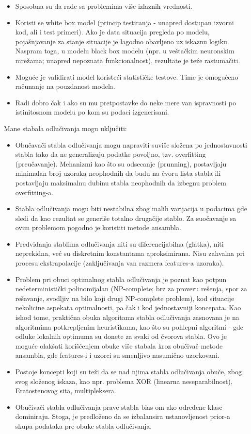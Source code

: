 \documentclass[fontsize=12bp, paper=a4]{scrarticle}
\begin{document}
\begin{itemize}
    \item Sposobna su da rade sa problemima više izlaznih vrednosti.
    \item Koristi se white box model (princip testiranja - unapred dostupan izvorni kod, ali i test primeri)\cite{wbox}. Ako je data situacija pregleda po modelu, pojašnjavanje za stanje situacije je lagodno obavljeno uz iskaznu logiku. Naspram toga, u modelu black box modelu (npr. u veštačkim neuronskim mrežama; unapred nepoznata funkcionalnost), rezultate je teže rastumačiti.
    \item Moguće je validirati model koristeći statističke testove. Time je omogućeno računanje na pouzdanost modela.
    \item Radi dobro čak i ako su mu pretpostavke do neke mere van ispravnosti po istinitosnom modelu po kom su podaci izgenerisani.
\end{itemize}

Mane stabala odlučivanja mogu uključiti:
\begin{itemize}
    \item Obučavači stabla odlučivanja mogu napraviti suviše složena po jednostavnosti stabla tako da ne generalizuju podatke povoljno, tzv. overfitting (preučavanje). Mehanizmi kao što su odsecanje (prunning), postavljaju minimalan broj uzoraka neophodnih da budu na čvoru lista stabla ili postavljaju maksimalnu dubinu stabla neophodnih da izbegnu problem overfitting-a. 
    \item Stabla odlučivanja mogu biti nestabilna zbog malih varijacija u podacima gde sledi da kao rezultat se generiše totalno drugačije stablo. Za suočavanje sa ovim problemom pogodno je koristiti metode ansambla.
    \item Predviđanja stablima odlučivanja niti su diferencijabilna (glatka), niti neprekidna, već su diskretnim konstantama aproksimirana. Nisu zahvalna pri procesu ekstrapolacije (zaključivanja van razmera features-a uzoraka)\cite{extrapolation}.
    \item Problem pri obuci optimalnog stabla odlučivanja je poznat kao potpun nedeterministički polinomijalan (NP-complete; brz za proveru rešenja, spor za rešavanje, svodljiv na bilo koji drugi NP-complete problem)\cite{np}, kod situacije nekolicine aspekata optimalnosti, pa čak i kod jednostavniji koncepata. Kao ishod tome, praktična obuka algoritama stabla odlučivanja zasnovana je na algoritmima potkrepljenim heuristikama, kao što su pohlepni algoritmi - gde odluke lokalnih optimuma su donete za svaki od čvorova stabla. Ovo je moguće olakšati korišćenjem obuke više stabala kroz obučivač metode ansambla, gde features-i i uzorci su smenljivo nasumično uzorkovani.
    \item Postoje koncepti koji su teži da se nad njima stabla odlučivanja obuče, zbog svog složenog iskaza, kao npr. problema XOR (linearna neseparabilnost)\cite{xor}, Eratostenovog sita\cite{sieve}, multipleksera.
    \item Obučivači stabla odlučivanja prave stabla bias-om ako određene klase dominiraju. Stoga, je predloženo da se izbalansira ustanovljenost prior-a skupa podataka pre obuke stabla odlučivanja.
\end{itemize}
\end{document}

